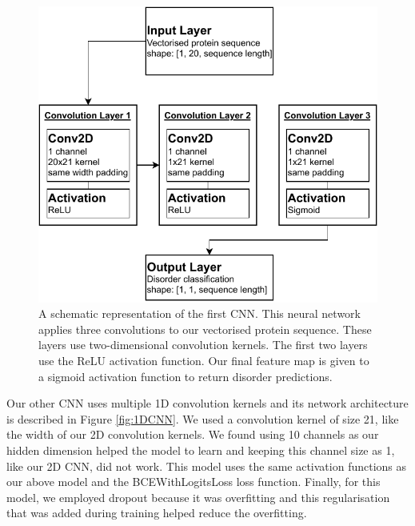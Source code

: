 \documentclass{l4proj}
\begin{document}
\begin{figure}[!ht]
    \centering
    \includegraphics[width=0.75\linewidth]{images/2DCNNdraw.pdf}    

    \caption{A schematic representation of the first CNN. This neural network applies three convolutions to our vectorised protein sequence. These layers use two-dimensional convolution kernels. The first two layers use the ReLU activation function. Our final feature map is given to a sigmoid activation function to return disorder predictions.}

    \label{fig:2DCNN} 
\end{figure}

Our other CNN uses multiple 1D convolution kernels and its network architecture is described in Figure \ref{fig:1DCNN}. We used a convolution kernel of size 21, like the width of our 2D convolution kernels. We found using 10 channels as our hidden dimension helped the model to learn and keeping this channel size as 1, like our 2D CNN, did not work. This model uses the same activation functions as our above model and the BCEWithLogitsLoss loss function. Finally, for this model, we employed dropout because it was overfitting and this regularisation that was added during training helped reduce the overfitting.
\end{document}
